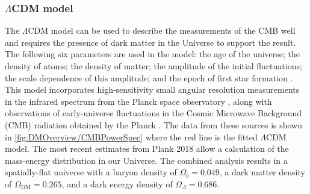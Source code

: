 \subsubsection{$\Lambda$CDM model}\label{sec:DMOverview/LambdaCDM}
The $\Lambda \text{CDM}$ model can be used to describe the measurements of the CMB well and requires the presence of dark matter in the Universe to support the result. The following six parameters are used in the model: the age of the universe; the density of atoms; the density of matter; the amplitude of the initial fluctuations; the scale dependence of this amplitude; and the epoch of first star formation \cite{LCDMparam}. This model incorporates high-sensitivity small angular resolution measurements in the infrared spectrum from the Planck space observatory \cite{2013Planck}, along with observations of early-universe fluctuations in the Cosmic Microwave Background (CMB) radiation obtained by the Planck \cite{WMAP}. The data from these sources is shown in \autoref{fig:DMOverview/CMBPowerSpec} where the red line is the fitted $\Lambda \text{CDM}$ model. The most recent estimates from Plank\cite{Planck:2018vyg} 2018 allow a calculation of the mass-energy distribution in our Universe. The combined analysis results in a spatially-flat universe with a baryon density of $\Omega_{b}=0.049$, a dark matter density of $\Omega_{\text{DM}}=0.265$, and a dark energy density of $\Omega_{\Lambda}=0.686$.

